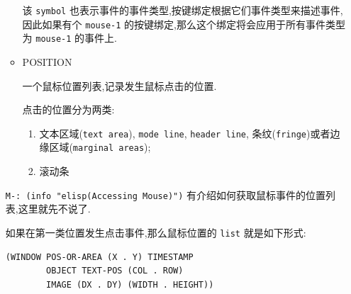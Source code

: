 \documentclass[11pt]{article}
\begin{document}
\begin{enumerate}
\begin{itemize}
该 \texttt{symbol} 也表示事件的事件类型,按键绑定根据它们事件类型来描述事件,因此如果有个 \texttt{mouse-1} 的按键绑定,那么这个绑定将会应用于所有事件类型为 \texttt{mouse-1} 的事件上.

\item POSITION

一个鼠标位置列表,记录发生鼠标点击的位置.

点击的位置分为两类:

\begin{enumerate}
\item 文本区域(\texttt{text area}), \texttt{mode line}, \texttt{header line}, 条纹(\texttt{fringe})或者边缘区域(\texttt{marginal areas});

\item 滚动条
\end{enumerate}
\end{itemize}


\texttt{M-: (info "elisp(Accessing Mouse)")} 有介绍如何获取鼠标事件的位置列表,这里就先不说了.


如果在第一类位置发生点击事件,那么鼠标位置的 \texttt{list} 就是如下形式:

\begin{verbatim}
(WINDOW POS-OR-AREA (X . Y) TIMESTAMP
        OBJECT TEXT-POS (COL . ROW)
        IMAGE (DX . DY) (WIDTH . HEIGHT))
\end{verbatim}


\end{enumerate}
\end{document}
